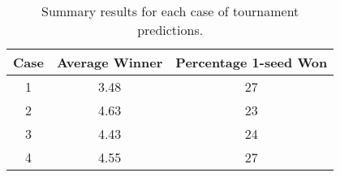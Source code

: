 \documentclass[11pt]{article}
\begin{document}
\begin{table}[h]\caption{Summary results for each case of tournament predictions.}\label{t:max}	
	\begin{center}\begin{tabular}{c|c|c}
			\textbf{Case} & \textbf{Average Winner} & \textbf{Percentage 1-seed Won}\\\hline 
			1             & 3.48                  & 27\\
			2             & 4.63                  & 23\\ 
			3             & 4.43                  & 24\\
			4             & 4.55                  & 27\\
		\end{tabular}\end{center}\end{table}
\end{document}
